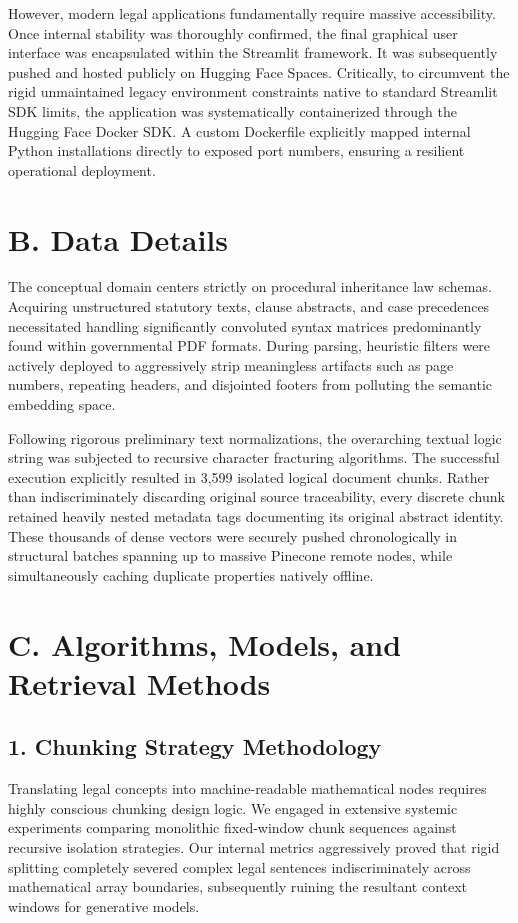 \documentclass[conference]{IEEEtran}
\begin{document}
However, modern legal applications fundamentally require massive accessibility. Once internal stability was thoroughly confirmed, the final graphical user interface was encapsulated within the Streamlit framework. It was subsequently pushed and hosted publicly on Hugging Face Spaces. Critically, to circumvent the rigid unmaintained legacy environment constraints native to standard Streamlit SDK limits, the application was systematically containerized through the Hugging Face Docker SDK. A custom Dockerfile explicitly mapped internal Python installations directly to exposed port numbers, ensuring a resilient operational deployment.

\section{B. Data Details}
The conceptual domain centers strictly on procedural inheritance law schemas. Acquiring unstructured statutory texts, clause abstracts, and case precedences necessitated handling significantly convoluted syntax matrices predominantly found within governmental PDF formats. During parsing, heuristic filters were actively deployed to aggressively strip meaningless artifacts such as page numbers, repeating headers, and disjointed footers from polluting the semantic embedding space.

Following rigorous preliminary text normalizations, the overarching textual logic string was subjected to recursive character fracturing algorithms. The successful execution explicitly resulted in 3,599 isolated logical document chunks. Rather than indiscriminately discarding original source traceability, every discrete chunk retained heavily nested metadata tags documenting its original abstract identity. These thousands of dense vectors were securely pushed chronologically in structural batches spanning up to massive Pinecone remote nodes, while simultaneously caching duplicate properties natively offline.

\section{C. Algorithms, Models, and Retrieval Methods}

\subsection{1. Chunking Strategy Methodology}
Translating legal concepts into machine-readable mathematical nodes requires highly conscious chunking design logic. We engaged in extensive systemic experiments comparing monolithic fixed-window chunk sequences against recursive isolation strategies. Our internal metrics aggressively proved that rigid splitting completely severed complex legal sentences indiscriminately across mathematical array boundaries, subsequently ruining the resultant context windows for generative models. 
\end{document}
